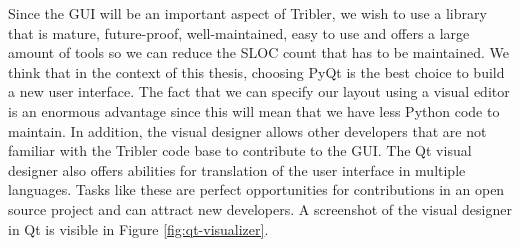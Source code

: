 Since the GUI will be an important aspect of Tribler, we wish to use a library that is mature, future-proof, well-maintained, easy to use and offers a large amount of tools so we can reduce the SLOC count that has to be maintained. We think that in the context of this thesis, choosing PyQt is the best choice to build a new user interface. The fact that we can specify our layout using a visual editor is an enormous advantage since this will mean that we have less Python code to maintain. In addition, the visual designer allows other developers that are not familiar with the Tribler code base to contribute to the GUI. The Qt visual designer also offers abilities for translation of the user interface in multiple languages. Tasks like these are perfect opportunities for contributions in an open source project and can attract new developers. A screenshot of the visual designer in Qt is visible in Figure \ref{fig:qt-visualizer}.

